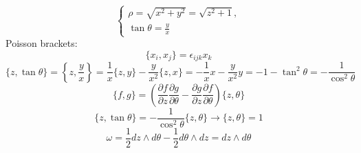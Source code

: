\documentclass[12pt]{article}
\theoremstyle{definition}
\begin{document}
\begin{enumerate}
\begin{itemize}
\begin{equation}
\begin{cases}
        \rho=\sqrt{x^2+y^2}=\sqrt{z^2+1},\\
        \tan\theta=\frac{y}{x}
    \end{cases}
\end{equation}
Poisson brackets:
\begin{equation}
    \{x_i,x_j\}=\epsilon_{ijk}x_k
\end{equation}
\begin{equation}
    \{z,\tan\theta\}=\left\{z,\frac{y}{x}\right\}=\frac{1}{x}\{z,y\}-\frac{y}{x^2}\{z,x\}=-\frac{1}{x}x-\frac{y}{x^2}y=-1-\tan^2\theta=-\frac{1}{\cos^2\theta}
\end{equation}
\begin{equation}
    \{f,g\}=\left(\frac{\partial f}{\partial z}\frac{\partial g}{\partial\theta}-\frac{\partial g}{\partial z}\frac{\partial f}{\partial\theta}\right)\{z,\theta\}
\end{equation}
\begin{equation}
    \{z,\tan\theta\}=-\frac{1}{\cos^2\theta}\{z,\theta\}\rightarrow\{z,\theta\}=1
\end{equation}
\begin{equation}
    \boxed{\omega=\frac{1}{2}dz\wedge d\theta-\frac{1}{2}d\theta\wedge dz=dz\wedge d\theta}
\end{equation}
\end{itemize}
\end{enumerate}
\end{document}

